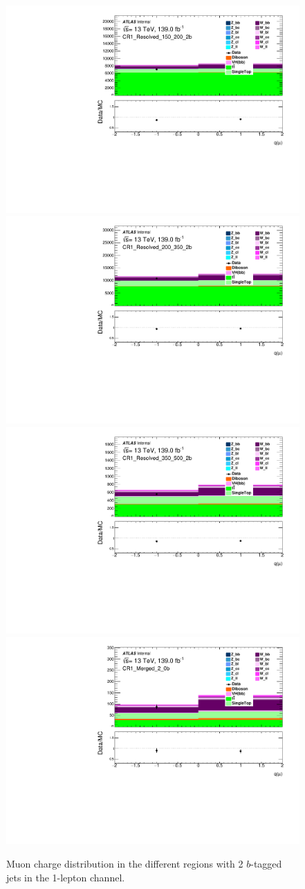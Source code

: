 \begin{figure}[!htb]
    \includegraphics[width=0.46\linewidth]{chapters/c8/figures/1L/DataMC_MonoH_Nominal_CR1_Resolved_150_200_2b_mu_charge.pdf}
    \includegraphics[width=0.46\linewidth]{chapters/c8/figures/1L/DataMC_MonoH_Nominal_CR1_Resolved_200_350_2b_mu_charge.pdf}\\
    \includegraphics[width=0.46\linewidth]{chapters/c8/figures/1L/DataMC_MonoH_Nominal_CR1_Resolved_350_500_2b_mu_charge.pdf}
    \includegraphics[width=0.46\linewidth]{chapters/c8/figures/1L/DataMC_MonoH_Nominal_CR1_Merged_2_0b_mu_charge.pdf}
    \caption{Muon charge distribution in the different \met regions with 2 $b$-tagged jets in the 1-lepton channel.}
    \label{fig:data-mc-1l-mu-charge-2b}
\end{figure}

